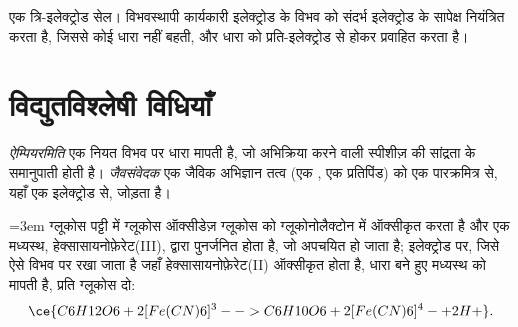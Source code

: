 \begin{omfigure}

{\small एक त्रि-इलेक्ट्रोड सेल। विभवस्थापी कार्यकारी इलेक्ट्रोड के विभव को
संदर्भ इलेक्ट्रोड के सापेक्ष नियंत्रित करता है, जिससे कोई धारा नहीं बहती,
और धारा को प्रति-इलेक्ट्रोड से होकर प्रवाहित करता है।}
\end{omfigure}

\section{विद्युतविश्लेषी विधियाँ}

\begin{definition}[ऐम्पियरमिति, जैवसंवेदक]\label{def:b3:electrode-kinetics:amperometry}
\emph{ऐम्पियरमिति} एक नियत विभव पर धारा मापती है, जो
अभिक्रिया करने वाली स्पीशीज़ की सांद्रता के समानुपाती होती है।
\emph{जैवसंवेदक} एक जैविक अभिज्ञान तत्व (एक
, एक प्रतिपिंड) को एक पारक्रमित्र से, यहाँ एक इलेक्ट्रोड से, जोड़ता है।
\end{definition}

\emergencystretch=3em ग्लूकोस पट्टी में ग्लूकोस ऑक्सीडेज़ ग्लूकोस को ग्लूकोनोलैक्टोन में ऑक्सीकृत करता है और
एक मध्यस्थ, हेक्सासायनोफ़ेरेट(III), द्वारा पुनर्जनित होता है, जो अपचयित हो जाता है;
इलेक्ट्रोड पर, जिसे ऐसे विभव पर रखा जाता है जहाँ हेक्सासायनोफ़ेरेट(II) ऑक्सीकृत होता है,
धारा बने हुए मध्यस्थ को मापती है, प्रति ग्लूकोस दो:
\[
  \ce{C6H12O6 + 2 [Fe(CN)6]^3- -> C6H10O6 + 2 [Fe(CN)6]^4- + 2 H+} .
\]

